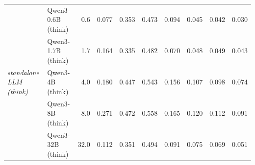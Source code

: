 \begin{table}[t]
{\begin{tabular}{llrrrrrrrr}
\midrule
\multirow{5}{*}{\textit{standalone LLM (think)}} & Qwen3-0.6B (think) & 0.6 & 0.077 & 0.353 & 0.473 & 0.094 & 0.045 & 0.042 & 0.030 \\
 & Qwen3-1.7B (think) & 1.7 & 0.164 & 0.335 & 0.482 & 0.070 & 0.048 & 0.049 & 0.043 \\
 & Qwen3-4B (think) & 4.0 & 0.180 & 0.447 & 0.543 & 0.156 & 0.107 & 0.098 & 0.074 \\
 & Qwen3-8B (think) & 8.0 & 0.271 & 0.472 & 0.558 & 0.165 & 0.120 & 0.112 & 0.091 \\
 & Qwen3-32B (think) & 32.0 & 0.112 & 0.351 & 0.494 & 0.091 & 0.075 & 0.069 & 0.051 \\
\bottomrule
\end{tabular}
}
\end{table}
